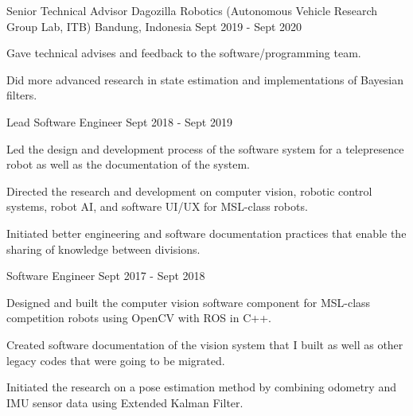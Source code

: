

\begin{cventries}
\cventry
{Senior Technical Advisor} %
{Dagozilla Robotics (Autonomous Vehicle Research Group Lab, ITB)} %
{Bandung, Indonesia} %
{Sept 2019 - Sept 2020} %
{
	\begin{cvitems} %
		\item {Gave technical advises and feedback to the software/programming team.}
		\item {Did more advanced research in state estimation and implementations of Bayesian filters.}
	\end{cvitems}
}

\cventry
{Lead Software Engineer} %
{} %
{} %
{Sept 2018 - Sept 2019} %
{
	\begin{cvitems} %
		\item {Led the design and development process of the software system for a telepresence robot as well as the documentation of the system.}
		\item {Directed the research and development on computer vision, robotic control systems, robot AI, and software UI/UX for MSL-class robots.}
		\item {Initiated better engineering and software documentation practices that enable the sharing of knowledge between divisions.}
	\end{cvitems}
}

\cventry
{Software Engineer} %
{} %
{} %
{Sept 2017 - Sept 2018} %
{
	\begin{cvitems} %
		\item {Designed and built the computer vision software component for MSL-class competition robots using OpenCV with ROS in C++.}
		\item {Created software documentation of the vision system that I built as well as other legacy codes that were going to be migrated.}
		\item {Initiated the research on a pose estimation method by combining odometry and IMU sensor data using Extended Kalman Filter.}
	\end{cvitems}
}


\end{cventries}
